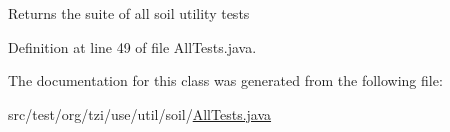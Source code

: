 \begin{DoxyReturn}{Returns}
the suite of all soil utility tests 
\end{DoxyReturn}


Definition at line 49 of file All\-Tests.\-java.



The documentation for this class was generated from the following file\-:\begin{DoxyCompactItemize}
\item 
src/test/org/tzi/use/util/soil/\hyperlink{util_2soil_2_all_tests_8java}{All\-Tests.\-java}\end{DoxyCompactItemize}
